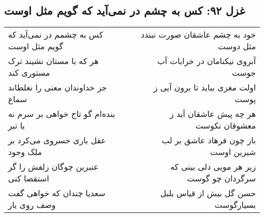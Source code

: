 \begin{center}
\section*{غزل ۹۲: کس به چشم در نمی‌آید که گویم مثل اوست}
\label{sec:092}
\begin{longtable}{l p{0.5cm} r}
کس به چشمم در نمی‌آید که گویم مثل اوست
&&
خود به چشم عاشقان صورت نبندد مثل دوست
\\
هر که با مستان نشیند ترک مستوری کند
&&
آبروی نیکنامان در خرابات آب جوست
\\
جز خداوندان معنی را نغلطاند سماع
&&
اولت مغزی بباید تا برون آیی ز پوست
\\
بنده‌ام گو تاج خواهی بر سرم نه یا تبر
&&
هر چه پیش عاشقان آید ز معشوقان نکوست
\\
عقل باری خسروی می‌کرد بر ملک وجود
&&
باز چون فرهاد عاشق بر لب شیرین اوست
\\
عنبرین چوگان زلفش را گر استقصا کنی
&&
زیر هر مویی دلی بینی که سرگردان چو گوست
\\
سعدیا چندان که خواهی گفت وصف روی یار
&&
حسن گل بیش از قیاس بلبل بسیارگوست
\\
\end{longtable}
\end{center}
